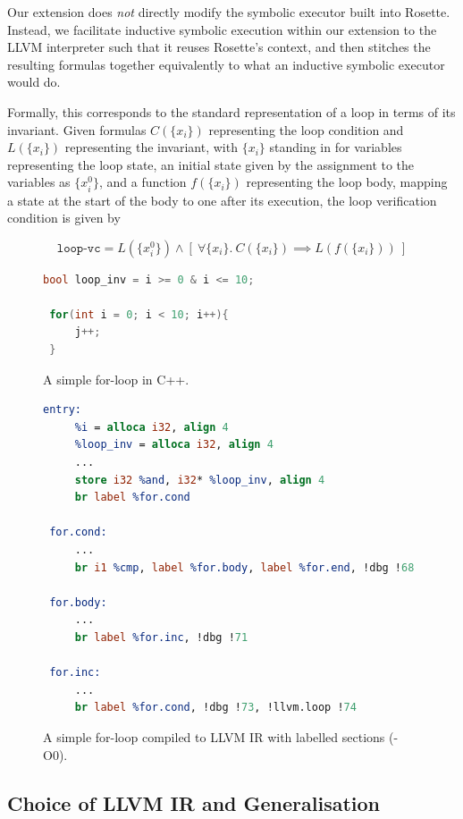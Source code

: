 \documentclass[11pt,a4paper,runningheads]{llncs}
\begin{document}
Our extension does \emph{not} directly modify the symbolic executor built into
Rosette. Instead, we facilitate inductive symbolic execution within our
extension to the LLVM interpreter such that it reuses Rosette's context, and
then stitches the resulting formulas together equivalently to what an inductive
symbolic executor would do.

Formally, this corresponds to the standard representation of a loop in terms of
its invariant. Given formulas \(C(\{x_i\})\) representing the loop condition and
\(L(\{x_i\})\) representing the invariant, with \(\{x_i\}\) standing in for
variables representing the loop state, an initial state given by the assignment
to the variables as \(\{x_i^0\}\), and a function \(f(\{x_i\})\) representing
the loop body, mapping a state at the start of the body to one after its
execution, the loop verification condition is given by

\begin{equation}
    \texttt{loop-vc} = L(\{x_i^0\}) \land \left[~\forall \{x_i\}.~ C(\{x_i\}) \implies L(f(\{x_i\}))~\right]
\end{equation}

\begin{figure}[!ht]
    \begin{lstlisting}[language=C++]
 bool loop_inv = i >= 0 & i <= 10;
 
 for(int i = 0; i < 10; i++){
     j++;
 }
    \end{lstlisting}
    \caption[C++ Loop]{A simple for-loop in C++.}
    \label{fig:cpploop}

    \begin{lstlisting}[language=llvm]
 entry:
     %i = alloca i32, align 4
     %loop_inv = alloca i32, align 4
     ...
     store i32 %and, i32* %loop_inv, align 4
     br label %for.cond
 
 for.cond:
     ...
     br i1 %cmp, label %for.body, label %for.end, !dbg !68
 
 for.body:
     ...
     br label %for.inc, !dbg !71
 
 for.inc:
     ...
     br label %for.cond, !dbg !73, !llvm.loop !74
    \end{lstlisting}
    \caption[LLVM Loop]{A simple for-loop compiled to LLVM IR with labelled sections (\textsf{-O0}).}
    \label{fig:llvmloop}
\end{figure}

\subsection{Choice of LLVM IR and Generalisation}
\label{subsec:llvmir}
\end{document}
